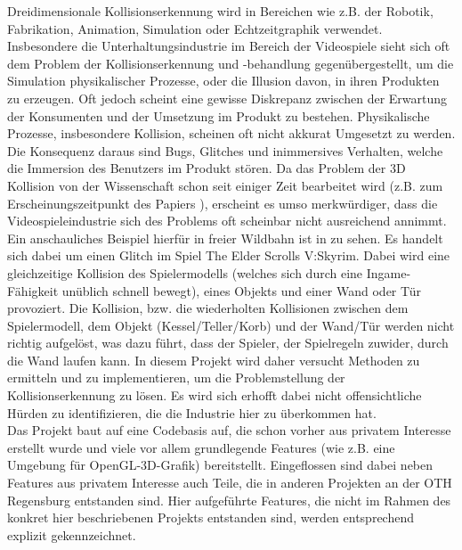 
Dreidimensionale Kollisionserkennung wird in Bereichen wie z.B. der Robotik, Fabrikation, Animation, Simulation oder Echtzeitgraphik verwendet.
Insbesondere die Unterhaltungsindustrie im Bereich der Videospiele sieht sich oft dem Problem der Kollisionserkennung und -behandlung gegenübergestellt, um die Simulation physikalischer Prozesse, oder die Illusion davon, in ihren Produkten zu erzeugen.
Oft jedoch scheint eine gewisse Diskrepanz zwischen der Erwartung der Konsumenten und der Umsetzung im Produkt zu bestehen. Physikalische Prozesse, insbesondere Kollision, scheinen oft nicht akkurat Umgesetzt zu werden. Die Konsequenz daraus sind Bugs, Glitches und inimmersives Verhalten, welche die Immersion des Benutzers im Produkt stören.
Da das Problem der 3D Kollision von der Wissenschaft schon seit einiger Zeit bearbeitet wird (z.B. zum Erscheinungszeitpunkt des Papiers \cite{gjk}), erscheint es umso merkwürdiger, dass die Videospieleindustrie sich des Problems oft scheinbar nicht ausreichend annimmt.\\
Ein anschauliches Beispiel hierfür in freier Wildbahn ist in \cite{skyrimwallglitch} zu sehen. Es handelt sich dabei um einen Glitch im Spiel The Elder Scrolls V:Skyrim. Dabei wird eine gleichzeitige Kollision des Spielermodells (welches sich durch eine Ingame-Fähigkeit unüblich schnell bewegt), eines Objekts und einer Wand oder Tür provoziert. Die Kollision, bzw. die wiederholten Kollisionen zwischen dem Spielermodell, dem Objekt (Kessel/Teller/Korb) und der Wand/Tür werden nicht richtig aufgelöst, was dazu führt, dass der Spieler, der Spielregeln zuwider, durch die Wand laufen kann.
In diesem Projekt wird daher versucht Methoden zu ermitteln und zu implementieren, um die Problemstellung der Kollisionserkennung zu lösen.
Es wird sich erhofft dabei nicht offensichtliche Hürden zu identifizieren, die die Industrie hier zu überkommen hat. \\
Das Projekt baut auf eine Codebasis auf, die schon vorher aus privatem Interesse erstellt wurde und viele vor allem grundlegende Features (wie z.B. eine Umgebung für OpenGL-3D-Grafik) bereitstellt. Eingeflossen sind dabei neben Features aus privatem Interesse auch Teile, die in anderen Projekten an der OTH Regensburg entstanden sind. Hier aufgeführte Features, die nicht im Rahmen des konkret hier beschriebenen Projekts entstanden sind, werden entsprechend explizit gekennzeichnet.